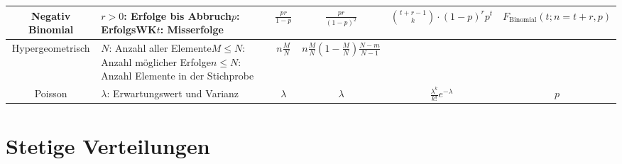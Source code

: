 {\begin{tabular}{||c|p{3.3cm}|*{4}{c|}|}
		Negativ Binomial                                             & $r>0$: Erfolge bis Abbruch\newline$p$: ErfolgsWK\newline$t$: Misserfolge &
		$\frac{pr}{1-p}$                                             & $\frac{pr}{(1-p)^2}$                                                     & $\binom{t+r-1}{k} \cdot (1-p)^rp^t$ &
		$F_{\text{Binomial}}(t;n=t+r,p)$                                                                                                                                                                                                                                            \\
		\hline

		Hypergeometrisch                                             & $N$: Anzahl aller Elemente\newline$M \leq N$: Anzahl möglicher
		Erfolge\newline$n \leq N$: Anzahl Elemente in der Stichprobe & $n\frac{M}{N}$                                                           &
		$n\frac{M}{N}\left(1-\frac{M}{N}\right)\frac{N-m}{N-1}$
		                                                             & \raisebox{-5pt}{$\frac{\binom{M}{t}\binom{N-M}{n-t}}{\binom{N}{n}}$}     &
		\raisebox{-5pt}{$\sum_{k=0}^{t}\frac{\binom{M}{k}\binom{N-M}{n-k}}{\binom{N}{n}}$}                                                                                                                                                                                          \\
		\hline

		Poisson                                                      & $\lambda$: Erwartungswert und Varianz                                    & $\lambda$                           & $\lambda$                         &
		$\frac{\lambda^k}{k!}e^{-\lambda}$                           & $p$                                                                                                                                                                                                          \\
		\hline
	\end{tabular}}
\section{Stetige Verteilungen}

